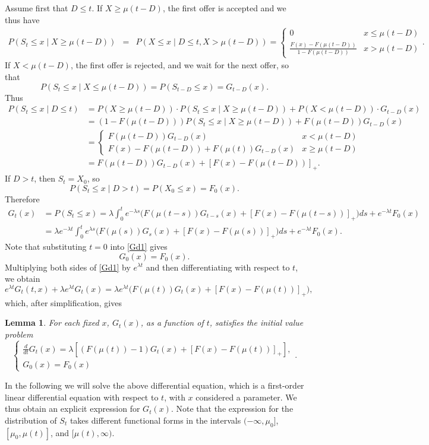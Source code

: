 \documentclass{article}
\newtheorem{lemma}{Lemma}[section]
\numberwithin{equation}{section}
\begin{document}
Assume first that $D\leq t$. If $X\geq \mu(t-D)$, the first offer is accepted and we thus have
\begin{eqnarray*}P(S_t\leq x\;|\;X\geq \mu(t-D))&=&P(X\leq x\;|\;D\leq t, X>\mu(t-D))=
	\begin{cases}
		0 & x\leq \mu(t-D)\\
		\frac{F(x)-F(\mu(t-D))}{1-F(\mu(t-D))} & x> \mu(t-D)
	\end{cases}.
\end{eqnarray*}
If $X<\mu(t-D)$, the first offer is rejected, and we wait for the next offer, so that 
$$P(S_t\leq x\;|\;X\leq \mu(t-D))=P(S_{t-D}\leq x)=G_{t-D}(x).$$
Thus
\begin{align*}P(S_t\leq x\;|\;D\leq t)&=P(X\geq \mu(t-D))\cdot P(S_t\leq x\;|\;X\geq \mu(t-D))+P(X< \mu(t-D))\cdot G_{t-D}(x)\\
	&=(1-F(\mu(t-D)))P(S_t\leq x\;|\;X\geq \mu(t-D))+F(\mu(t-D))G_{t-D}(x)\\
	&=\begin{cases}
		F(\mu(t-D))G_{t-D}(x) & x<\mu(t-D)\\
		F(x)-F(\mu(t-D))+F(\mu(t))G_{t-D}(x)& x\geq \mu(t-D)
	\end{cases}\\
	&= F(\mu(t-D))G_{t-D}(x)+ [F(x)-F(\mu(t-D))]_+.
\end{align*}
If $D>t$, then $S_t=X_0$, so
$$P(S_t\leq x\;|\;D>t)=P(X_0\leq x)=F_0(x).$$
Therefore
\begin{align}\label{Gd1}G_t(x)&=P(S_t\leq x)=\lambda \int_0^t e^{-\lambda s}\Big( F(\mu(t-s))G_{t-s}(x)+ [F(x)-F(\mu(t-s))]_+ \Big)ds+e^{-\lambda t}F_0(x)\nonumber\\
	&=\lambda e^{-\lambda t}\int_0^t e^{\lambda s}\Big( F(\mu(s))G_s(x)+ [F(x)-F(\mu(s))]_+ \Big)ds+e^{-\lambda t}F_0(x).\end{align}
Note that substituting $t=0$ into \eqref{Gd1} gives
$$G_0(x)=F_0(x).$$
Multiplying both sides of \eqref{Gd1} by
$e^{\lambda t}$ and then 
differentiating with respect to $t$, we obtain
$$e^{\lambda t}G_t(t,x)+\lambda e^{\lambda t}G_t(x)=\lambda e^{\lambda t}\Big( F(\mu(t))G_t(x)+ [F(x)-F(\mu(t))]_+ \Big),$$
which, after simplification, gives
\begin{lemma} For each fixed $x$, $G_t(x)$, as a function of $t$, satisfies the  initial value problem
	\begin{equation}\label{deg} \begin{cases}\frac{d}{dt}G_t(x)=\lambda  \left[(F(\mu(t))-1)G_t(x)+[F(x)-F(\mu(t))]_+ \right],\\
			G_0(x)=F_0(x) 
		\end{cases}.
	\end{equation}
\end{lemma}
In the following we will solve the above differential 
equation, which is a first-order linear differential equation with respect to $t$, with $x$ considered a parameter. We thus obtain an explicit expression for $G_t(x)$.
Note that the expression
for the distribution of $S_t$ takes
different functional forms in the intervals 
$(-\infty,\mu_0]$, $[\mu_0,\mu(t)]$, and 
$[\mu(t),\infty)$. 
\end{document}
